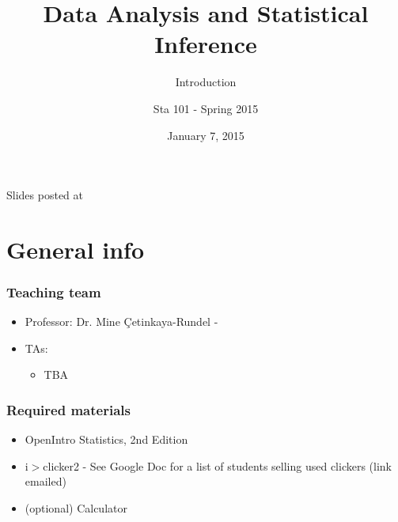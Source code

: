 \documentclass[slidestop,compress,mathserif,12pt,t,professionalfonts,xcolor=table]{beamer}
\title{Data Analysis and Statistical Inference}
\subtitle{Introduction}
\author{Sta 101 - Spring 2015}
\date{January 7, 2015}
\institute{Duke University, Department of Statistical Science}
\begin{document}



\begin{frame}[plain]

\titlepage
\vfill
{\scriptsize {} \hfill Slides posted at  }
\addtocounter{framenumber}{-1} 

\end{frame}


\section{General info}



\begin{frame}
\frametitle{Teaching team}

\begin{itemize}

\item Professor: Dr. Mine \c{C}etinkaya-Rundel - 

\item TAs:
\begin{itemize}
\item TBA
\end{itemize}

\end{itemize}

\end{frame}


\begin{frame}
\frametitle{Required materials}

\begin{itemize}

\item OpenIntro Statistics, 2nd Edition

\item i$>$clicker2 - See Google Doc for a list of students selling used clickers (link emailed)

\item (optional) Calculator

\end{itemize}

\end{frame}
\end{document}

